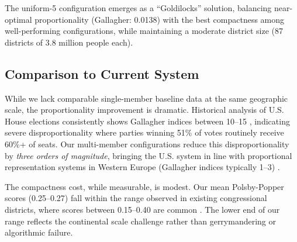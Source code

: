 The uniform-5 configuration emerges as a ``Goldilocks'' solution, balancing near-optimal proportionality (Gallagher: 0.0138) with the best compactness among well-performing configurations, while maintaining a moderate district size (87 districts of 3.8 million people each).

\subsection{Comparison to Current System}

While we lack comparable single-member baseline data at the same geographic scale, the proportionality improvement is dramatic. Historical analysis of U.S. House elections consistently shows Gallagher indices between 10--15 \cite{lijphart1999patterns}, indicating severe disproportionality where parties winning 51\% of votes routinely receive 60\%+ of seats. Our multi-member configurations reduce this disproportionality by \emph{three orders of magnitude}, bringing the U.S. system in line with proportional representation systems in Western Europe (Gallagher indices typically 1--3) \cite{gallagher2015election}.

The compactness cost, while measurable, is modest. Our mean Polsby-Popper scores (0.25--0.27) fall within the range observed in existing congressional districts, where scores between 0.15--0.40 are common \cite{polsby1991third}. The lower end of our range reflects the continental scale challenge rather than gerrymandering or algorithmic failure.
